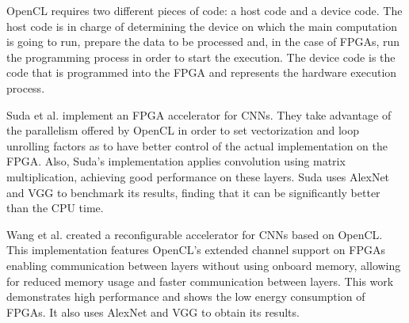 OpenCL requires two different pieces of code: a host code and a device code. The
host code is in charge of determining the device on which the main computation is
going to run, prepare the data to be processed and, in the case of FPGAs, run the 
programming process in order to start the execution. The device code is the
code that is programmed into the FPGA and represents the hardware execution process.

Suda et al. \cite{suda} implement an FPGA accelerator for CNNs. They take advantage
of the parallelism offered by OpenCL in order to set vectorization and 
loop unrolling factors as to have better control of the actual implementation
on the FPGA. Also, Suda's implementation applies convolution using
matrix multiplication, achieving good performance on these layers. Suda
uses AlexNet and VGG to benchmark its results, finding that it can be
significantly better than the CPU time.

Wang et al. \cite{pipecnn} created a reconfigurable accelerator for CNNs
based on OpenCL. This implementation features OpenCL's extended channel support 
on FPGAs enabling communication between layers without using onboard memory, allowing
for reduced memory usage and faster communication between layers.
This work demonstrates high performance and shows the low energy consumption
of FPGAs. It also uses AlexNet and VGG to obtain its results.